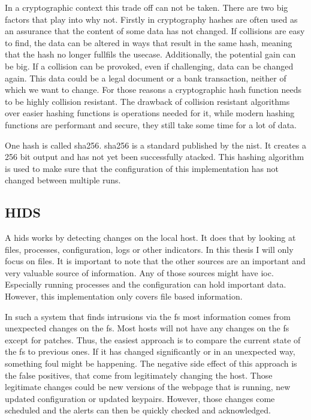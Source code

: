 In a cryptographic context this trade off can not be taken. There are two big factors that play into why not. Firstly in cryptography hashes are often used as an assurance that the content of some data has not changed. If collisions are easy to find, the data can be altered in ways that result in the same hash, meaning that the hash no longer fullfils the usecase. Additionally, the potential gain can be big. If a collision can be provoked, even if challenging, data can be changed again. This data could be a legal document or a bank transaction, neither of which we want to change. For those reasons a cryptographic hash function needs to be highly collision resistant. The drawback of collision resistant algorithms over easier hashing functions is operations needed for it, while modern hashing functions are performant and secure, they still take some time for a lot of data. \cite{crypto}

One \gls{hash} is called \gls{sha256}. \gls{sha256} is a standard published by the \gls{nist}. It creates a 256 bit output and has not yet been successfully atacked. \cite{sha} This hashing algorithm is used to make sure that the configuration of this implementation has not changed between multiple runs.


\subsection{HIDS}
\label{sec:def:hids}

A \gls{hids} works by detecting changes on the local host. It does that by looking at files, processes, configuration, logs or other indicators. In this thesis I will only focus on files. It is important to note that the other sources are an important and very valuable source of information. Any of those sources might have \gls{ioc}. Especially running processes and the configuration can hold important data. However, this implementation only covers file based information.

In such a system that finds intrusions via the \gls{fs} most information comes from unexpected changes on the \gls{fs}. Most hosts will not have any changes on the \gls{fs} except for patches. Thus, the easiest approach is to compare the current state of the \gls{fs} to previous ones. If it has changed significantly or in an unexpected way, something foul might be happening. The negative side effect of this approach is the false positives, that come from legitimately changing the host. Those legitimate changes could be new versions of the webpage that is running, new updated configuration or updated keypairs. However, those changes come scheduled and the alerts can then be quickly checked and acknowledged.

